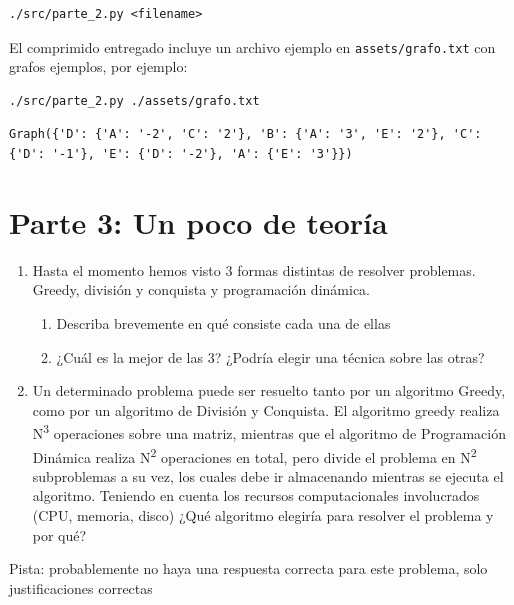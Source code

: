 \documentclass[titlepage,a4paper]{article}
\begin{document}
\begin{verbatim}
./src/parte_2.py <filename>
\end{verbatim}

El comprimido entregado incluye un archivo ejemplo en \texttt{assets/grafo.txt} con grafos ejemplos,
por ejemplo:

\begin{verbatim}
./src/parte_2.py ./assets/grafo.txt
\end{verbatim}

\begin{verbatim}
Graph({'D': {'A': '-2', 'C': '2'}, 'B': {'A': '3', 'E': '2'}, 'C': {'D': '-1'}, 'E': {'D': '-2'}, 'A': {'E': '3'}})
\end{verbatim}

\section{Parte 3: Un poco de teoría}
\label{sec:org10ba1fc}

\begin{enumerate}
\item Hasta el momento hemos visto 3 formas distintas de resolver problemas. Greedy, división y conquista y programación dinámica.

\begin{enumerate}
\item Describa brevemente en qué consiste cada una de ellas

\item ¿Cuál es la mejor de las 3? ¿Podría elegir una técnica sobre las otras?
\end{enumerate}

\item Un determinado problema puede ser resuelto tanto por un algoritmo Greedy, como por un algoritmo de División y Conquista. El algoritmo greedy realiza N\textsuperscript{3} operaciones sobre una matriz, mientras que el algoritmo de Programación Dinámica realiza N\textsuperscript{2} operaciones en total, pero divide el problema en N\textsuperscript{2} subproblemas a su vez, los cuales debe ir almacenando mientras se ejecuta el algoritmo. Teniendo en cuenta los recursos computacionales involucrados (CPU, memoria, disco) ¿Qué algoritmo elegiría para resolver el problema y por qué?
\end{enumerate}

Pista: probablemente no haya una respuesta correcta para este problema, solo justificaciones correctas
\end{document}
